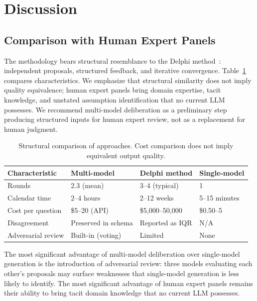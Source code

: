 \documentclass[11pt,a4paper]{article}
\begin{document}
\section{Discussion}
\label{sec:discussion}

\subsection{Comparison with Human Expert Panels}

The methodology bears structural resemblance to the Delphi method~\cite{linstone1975delphi}: independent proposals, structured feedback, and iterative convergence. Table~\ref{tab:comparison} compares characteristics. We emphasize that structural similarity does not imply quality equivalence; human expert panels bring domain expertise, tacit knowledge, and unstated assumption identification that no current LLM possesses. We recommend multi-model deliberation as a preliminary step producing structured inputs for human expert review, not as a replacement for human judgment.

\begin{table}[ht]
\centering
\caption{Structural comparison of approaches. Cost comparison does not imply equivalent output quality.}
\label{tab:comparison}
\begin{tabular}{@{}p{2.5cm}p{3.5cm}p{3.5cm}p{3cm}@{}}
\toprule
\textbf{Characteristic} & \textbf{Multi-model} & \textbf{Delphi method} & \textbf{Single-model} \\
\midrule
Rounds & 2.3 (mean) & 3--4 (typical) & 1 \\
Calendar time & 2--4 hours & 2--12 weeks & 5--15 minutes \\
Cost per question & \$5--20 (API) & \$5{,}000--50{,}000 & \$0.50--5 \\
Disagreement & Preserved in schema & Reported as IQR & N/A \\
Adversarial review & Built-in (voting) & Limited & None \\
\bottomrule
\end{tabular}
\end{table}

The most significant advantage of multi-model deliberation over single-model generation is the introduction of adversarial review: three models evaluating each other's proposals may surface weaknesses that single-model generation is less likely to identify. The most significant advantage of human expert panels remains their ability to bring tacit domain knowledge that no current LLM possesses.
\end{document}
